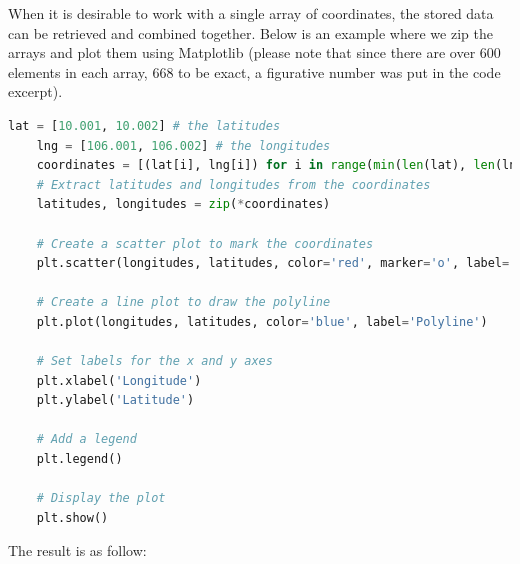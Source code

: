 When it is desirable to work with a single array of coordinates, the stored data can be retrieved and combined together. Below is an example where we zip the arrays and plot them using Matplotlib (please note that since there are over 600 elements in each array, 668 to be exact, a figurative number was put in the code excerpt).

\begin{lstlisting}[basicstyle=\ttfamily\small, language=python]
    lat = [10.001, 10.002] # the latitudes
    lng = [106.001, 106.002] # the longitudes
    coordinates = [(lat[i], lng[i]) for i in range(min(len(lat), len(lng)))]
    # Extract latitudes and longitudes from the coordinates
    latitudes, longitudes = zip(*coordinates)
    
    # Create a scatter plot to mark the coordinates
    plt.scatter(longitudes, latitudes, color='red', marker='o', label='Coordinates')
    
    # Create a line plot to draw the polyline
    plt.plot(longitudes, latitudes, color='blue', label='Polyline')
    
    # Set labels for the x and y axes
    plt.xlabel('Longitude')
    plt.ylabel('Latitude')
    
    # Add a legend
    plt.legend()
    
    # Display the plot
    plt.show()
\end{lstlisting}

The result is as follow:
\begin{figure}[H]
    \centering
    \hspace{0.5cm} %
\end{figure}

